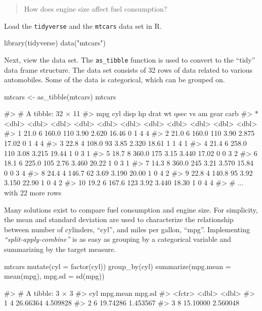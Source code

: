 \begin{quote}
How does engine size affect fuel consumption?
\end{quote}

Load the \texttt{tidyverse} and the \texttt{mtcars} data set in R.

\begin{Schunk}
\begin{Sinput}
library(tidyverse)
data("mtcars")
\end{Sinput}
\end{Schunk}

Next, view the data set. The \texttt{as\_tibble} function is used to
convert to the ``tidy'' data frame structure. The data set consists of
32 rows of data related to various automobiles. Some of the data is
categorical, which can be grouped on.

\begin{Schunk}
\begin{Sinput}
mtcars <- as_tibble(mtcars)
mtcars
\end{Sinput}
\begin{Soutput}
#> # A tibble: 32 × 11
#>      mpg   cyl  disp    hp  drat    wt  qsec    vs    am  gear  carb
#> *  <dbl> <dbl> <dbl> <dbl> <dbl> <dbl> <dbl> <dbl> <dbl> <dbl> <dbl>
#> 1   21.0     6 160.0   110  3.90 2.620 16.46     0     1     4     4
#> 2   21.0     6 160.0   110  3.90 2.875 17.02     0     1     4     4
#> 3   22.8     4 108.0    93  3.85 2.320 18.61     1     1     4     1
#> 4   21.4     6 258.0   110  3.08 3.215 19.44     1     0     3     1
#> 5   18.7     8 360.0   175  3.15 3.440 17.02     0     0     3     2
#> 6   18.1     6 225.0   105  2.76 3.460 20.22     1     0     3     1
#> 7   14.3     8 360.0   245  3.21 3.570 15.84     0     0     3     4
#> 8   24.4     4 146.7    62  3.69 3.190 20.00     1     0     4     2
#> 9   22.8     4 140.8    95  3.92 3.150 22.90     1     0     4     2
#> 10  19.2     6 167.6   123  3.92 3.440 18.30     1     0     4     4
#> # ... with 22 more rows
\end{Soutput}
\end{Schunk}

Many solutions exist to compare fuel consumption and engine size. For
simplicity, the mean and standard deviation are used to characterize the
relationship between number of cylinders, ``cyl'', and miles per gallon,
``mpg''. Implementing \emph{``split-apply-combine''} is as easy as
grouping by a categorical variable and summarizing by the target
measure.

\begin{Schunk}
\begin{Sinput}
mtcars %
    mutate(cyl = factor(cyl)) %
    group_by(cyl) %
    summarize(mpg.mean = mean(mpg),
              mpg.sd = sd(mpg))
\end{Sinput}
\begin{Soutput}
#> # A tibble: 3 × 3
#>      cyl mpg.mean   mpg.sd
#>   <fctr>    <dbl>    <dbl>
#> 1      4 26.66364 4.509828
#> 2      6 19.74286 1.453567
#> 3      8 15.10000 2.560048
\end{Soutput}
\end{Schunk}

